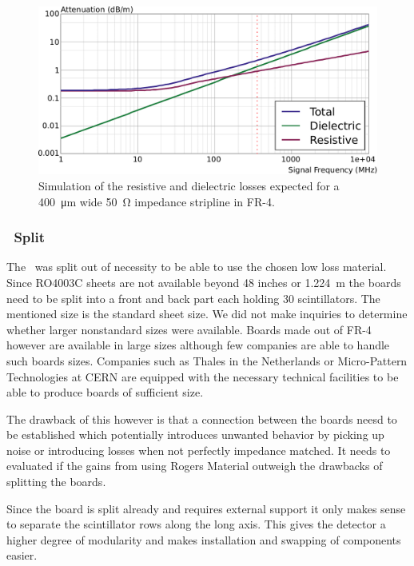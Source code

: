 \documentclass[../BTOF_summary.tex]{subfiles}
\begin{document}
\begin{figure}
	\centering
	\includegraphics*[width=.8\textwidth]{fig/Loss_Curve_Sebastian_v3.pdf}
	\caption{Simulation of the resistive and dielectric losses expected for a \SI{400}{\micro m} wide \SI{50}{\ohm} impedance stripline in FR-4.}
	\label{fig:LowLossCurve}
\end{figure}

\subsubsection{\railboard\ Split}

The \railboard\ was split out of necessity to be able to use the chosen low loss material.
Since RO4003C sheets are not available beyond 48 inches or \SI{1.224}{m} the boards need to be split into a front and back part each holding 30 scintillators.
The mentioned size is the standard sheet size.
We did not make inquiries to determine whether larger nonstandard sizes were available.
Boards made out of FR-4 however are available in large sizes although few companies are able to handle such boards sizes.
Companies such as Thales in the Netherlands or Micro-Pattern Technologies at CERN are equipped with the necessary technical facilities to be able to produce boards of sufficient size.

The drawback of this however is that a connection between the boards neesd to be established which potentially introduces unwanted behavior by picking up noise or introducing losses when not perfectly impedance matched.
It needs to evaluated if the gains from using Rogers Material outweigh the drawbacks of splitting the boards.

Since the board is split already and requires external support it only makes sense to separate the scintillator rows along the long axis.
This gives the detector a higher degree of modularity and makes installation and swapping of components easier.

\end{document}
